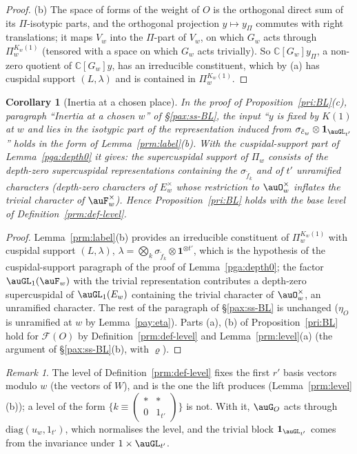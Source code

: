 \documentclass[10pt]{amsart}
\newtheorem{corollary}[theorem]{Corollary}
\theoremstyle{definition}
\theoremstyle{remark}
\newtheorem{remark}[theorem]{Remark}
\newcommand{\C}{\mathbb C}
\begin{document}
\begin{proof}
(b) The space of forms of the weight of $O$ is the orthogonal direct sum of its $\Pi$-isotypic parts,
and the orthogonal projection $y\mapsto y_\Pi$ commutes with right translations; it maps $V_w$ into the
$\Pi$-part of $V_w$, on which $G_w$ acts through $\Pi_w^{K_w(1)}$ (tensored with a space on which $G_w$
acts trivially). So $\C[G_w]y_\Pi$, a non-zero quotient of $\C[G_w]y$, has an irreducible constituent,
which by (a) has cuspidal support $(L,\lambda)$ and is contained in $\Pi_w^{K_w(1)}$.
\end{proof}

\begin{corollary}[Inertia at a chosen place]\label{prm:inertia}
In the proof of Proposition~\ref{pri:BL}(c), paragraph ``Inertia at a chosen $w$'' of
\S\ref{pax:ss-BL}, the input ``$y$ is fixed by $K(1)$ at $w$ and lies in the isotypic part of the
representation induced from $\sigma_{\tilde c_w}\otimes\mathbf 1_{\auGL_{t'}}$'' holds in the form of
Lemma~\ref{prm:label}(b). With the cuspidal-support part of Lemma~\ref{pga:depth0} it gives: the
supercuspidal support of $\Pi_w$ consists of the depth-zero supercuspidal representations containing
the $\sigma_{\tilde f_k}$ and of $t'$ unramified characters (depth-zero characters of $E_w^\times$ whose
restriction to $\auO_w^\times$ inflates the trivial character of $\auF_w^\times$). Hence
Proposition~\ref{pri:BL} holds with the base level of Definition~\ref{prm:def-level}.
\end{corollary}
\begin{proof}
Lemma~\ref{prm:label}(b) provides an irreducible constituent of $\Pi_w^{K_w(1)}$ with cuspidal support
$(L,\lambda)$, $\lambda=\bigotimes_k\sigma_{\tilde f_k}\otimes\mathbf 1^{\otimes t'}$, which is the
hypothesis of the cuspidal-support paragraph of the proof of Lemma~\ref{pga:depth0}; the factor
$\auGL_1(\auF_w)$ with the trivial representation contributes a depth-zero supercuspidal of
$\auGL_1(E_w)$ containing the trivial character of $\auO_w^\times$, an unramified character. The rest of
the paragraph of \S\ref{pax:ss-BL} is unchanged ($\eta_O$ is unramified at $w$ by Lemma~\ref{pay:eta}).
Parts (a), (b) of Proposition~\ref{pri:BL} hold for $\mathcal F(O)$ by Definition~\ref{prm:def-level}
and Lemma~\ref{prm:level}(a) (the argument of \S\ref{pax:ss-BL}(b), with $\varrho$).
\end{proof}

\begin{remark}\label{prm:rem-level}
The level of Definition~\ref{prm:def-level} fixes the first $r'$ basis vectors modulo $w$ (the
vectors of $W$), and is the one the lift produces (Lemma~\ref{prm:level}(b)); a level of the form
$\{k\equiv\left(\begin{smallmatrix}*&*\\0&1_{t'}\end{smallmatrix}\right)\}$ is not. With it,
$\auG_O$ acts through $\mathrm{diag}(u_w,1_{t'})$, which normalises the level, and the trivial block
$\mathbf 1_{\auGL_{t'}}$ comes from the invariance under $1\times\auGL_{t'}$.
\end{remark}
\end{document}
